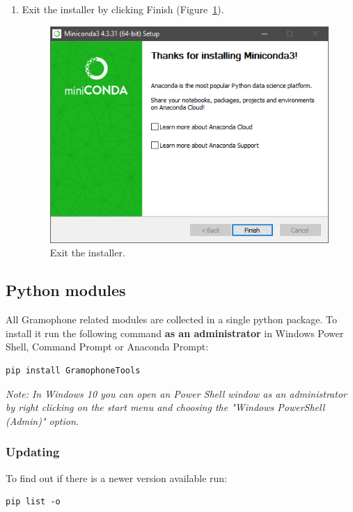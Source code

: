 \documentclass[11pt,a4paper]{article}
\newcommand{\note}[1]{\textit{Note: {#1}}}
\begin{document}
\begin{enumerate}
\item Exit the installer by clicking Finish (Figure~\ref{fig:miniconda_install_done2}).
	\begin{figure}[H]
	\centering
	\includegraphics[scale=0.8]{miniconda_install_done2.PNG}
	\caption{Exit the installer.}
	\label{fig:miniconda_install_done2}
	\end{figure}

\end{enumerate}

\newpage
\subsection{Python modules}
All Gramophone related modules are collected in a single python package. To install it run the following command \textbf{as an administrator} in Windows Power Shell, Command Prompt or Anaconda Prompt:
\begin{verbatim}
pip install GramophoneTools
\end{verbatim}

\note{In Windows 10 you can open an Power Shell window as an administrator by right clicking on the start menu and choosing the "Windows PowerShell (Admin)" option.}

\subsubsection{Updating}
To find out if there is a newer version available run:
\begin{verbatim}
pip list -o
\end{verbatim}
\end{document}
